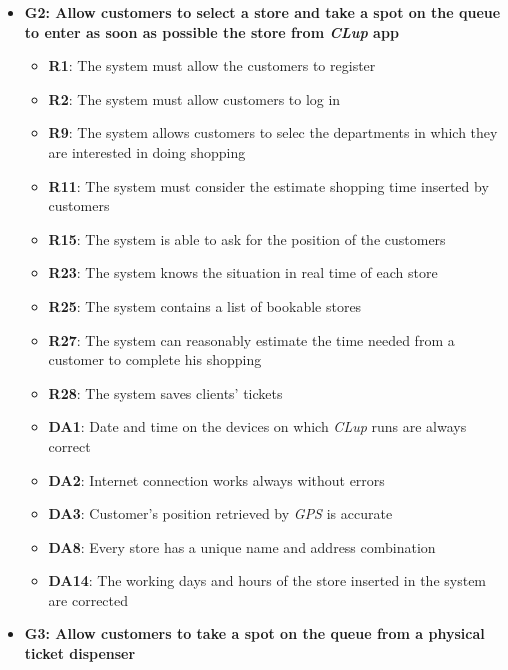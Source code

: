 \documentclass{article}
\begin{document}
\begin{itemize}
\begin{itemize}
					\end{itemize}
				
				\item {\bfseries G2: Allow customers to select a store and take a spot on the queue to enter as soon as possible the store from \emph{CLup} app}	

					\begin{itemize}
						
						\item {\bfseries R1}: The system must allow the customers to register
						\item {\bfseries R2}: The system must allow customers to log in
						\item {\bfseries R9}: The system allows customers to selec the departments in which they are interested in doing shopping							\item {\bfseries R11}: The system must consider the estimate shopping time inserted by customers
						\item {\bfseries R15}: The system is able to ask for the position of the customers
						\item {\bfseries R23}: The system knows the situation in real time of each store
						\item {\bfseries R25}: The system contains a list of bookable stores
						\item {\bfseries R27}: The system can reasonably estimate the time needed from a customer to complete his shopping
						\item {\bfseries R28}: The system saves clients' tickets \\
		
						\item {\bfseries DA1}: Date and time on the devices on which \emph{CLup} runs are always correct
						\item {\bfseries DA2}: Internet connection works always without errors
						\item {\bfseries DA3}: Customer’s position retrieved by \emph{GPS} is accurate
						\item {\bfseries DA8}: Every store has a unique name and address combination
						\item {\bfseries DA14}: The working days and hours of the store inserted in the system are corrected
						
					\end{itemize}

				\item {\bfseries G3: Allow customers to take a spot on the queue from a physical ticket dispenser}	


\end{itemize}
\end{document}
